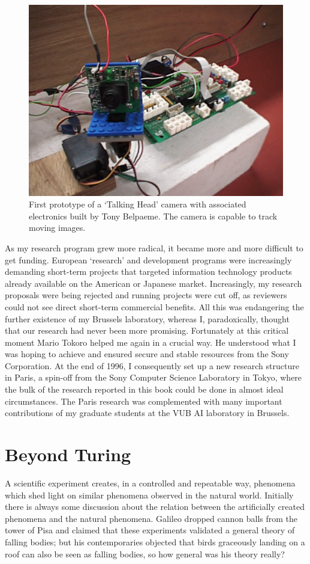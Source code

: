 \begin{figure}[htbp]
  \centerline{\includegraphics[width=.70\textwidth]{chap1/figs/eye}}
\caption{\small First prototype of a `Talking Head' camera with 
associated electronics built by Tony Belpaeme. The camera is capable to track moving images. }
\label{f:plate7}
\end{figure}

As my research program grew more radical, it became more 
and more difficult to get funding. 
European `research' and development programs were 
increasingly demanding short-term projects that targeted information
technology products already available on the American or Japanese 
market. Increasingly, my
research proposals were being rejected and running projects were
cut off,
as reviewers could not see direct short-term 
commercial benefits. All this was endangering the further existence
of my Brussels laboratory, whereas I, paradoxically, thought that
our research had never been more promising. 
Fortunately at this critical moment Mario Tokoro
helped me again in a crucial way. He understood what I was
hoping to achieve and ensured secure and stable resources from 
the Sony Corporation. At the end of 1996, I consequently set up a new research
structure in Paris, a spin-off from the Sony Computer Science
Laboratory in Tokyo, where the bulk of the research reported
in this book could be done in almost ideal circumstances. 
The Paris research was complemented with many important 
contributions of my graduate students
at the VUB AI laboratory in Brussels. 

\section{Beyond Turing}

A scientific experiment creates, in a controlled
and repeatable way, phenomena which shed light on
similar phenomena observed in the natural
world. Initially there is
always some discussion about the relation between 
the artificially created phenomena and the natural
phenomena. Galileo dropped cannon balls from
the tower of Pisa and claimed that these experiments validated 
a general theory of falling bodies; but his contemporaries 
objected that birds graceously landing on a roof can
also be seen as falling bodies, so how general was 
his theory really?  

